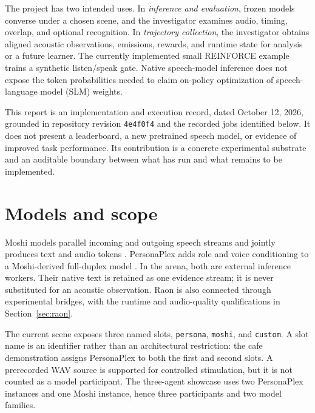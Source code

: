 \documentclass{article}
\newcommand{\code}[1]{\texttt{#1}}
\begin{document}
The project has two intended uses. In \emph{inference and evaluation}, frozen models converse under a chosen scene, and the investigator examines audio, timing, overlap, and optional recognition. In \emph{trajectory collection}, the investigator obtains aligned acoustic observations, emissions, rewards, and runtime state for analysis or a future learner. The currently implemented small REINFORCE example trains a synthetic listen/speak gate. Native speech-model inference does not expose the token probabilities needed to claim on-policy optimization of speech-language model (SLM) weights.

This report is an implementation and execution record, dated October 12, 2026, grounded in repository revision \code{4e4f0f4} and the recorded jobs identified below. It does not present a leaderboard, a new pretrained speech model, or evidence of improved task performance. Its contribution is a concrete experimental substrate and an auditable boundary between what has run and what remains to be implemented.

\section{Models and scope}
Moshi models parallel incoming and outgoing speech streams and jointly produces text and audio tokens \citep{defossez2024moshi}. PersonaPlex adds role and voice conditioning to a Moshi-derived full-duplex model \citep{roy2026personaplex}. In the arena, both are external inference workers. Their native text is retained as one evidence stream; it is never substituted for an acoustic observation. Raon is also connected through experimental bridges, with the runtime and audio-quality qualifications in Section~\ref{sec:raon}.

The current scene exposes three named slots, \code{persona}, \code{moshi}, and \code{custom}. A slot name is an identifier rather than an architectural restriction: the cafe demonstration assigns PersonaPlex to both the first and second slots. A prerecorded WAV source is supported for controlled stimulation, but it is not counted as a model participant. The three-agent showcase uses two PersonaPlex instances and one Moshi instance, hence three participants and two model families.
\end{document}
